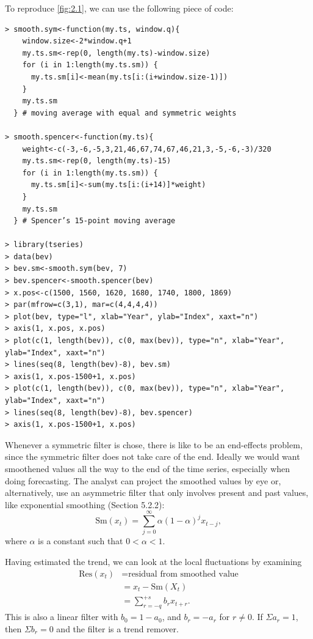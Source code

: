 To reproduce \cref{fig:2.1}, we can use the following piece of code:
\begin{verbatim}
> smooth.sym<-function(my.ts, window.q){
    window.size<-2*window.q+1
    my.ts.sm<-rep(0, length(my.ts)-window.size)
    for (i in 1:length(my.ts.sm)) {
      my.ts.sm[i]<-mean(my.ts[i:(i+window.size-1)])
    }
    my.ts.sm
  } # moving average with equal and symmetric weights

> smooth.spencer<-function(my.ts){
    weight<-c(-3,-6,-5,3,21,46,67,74,67,46,21,3,-5,-6,-3)/320
    my.ts.sm<-rep(0, length(my.ts)-15)
    for (i in 1:length(my.ts.sm)) {
	  my.ts.sm[i]<-sum(my.ts[i:(i+14)]*weight)
    }
    my.ts.sm
  } # Spencer’s 15-point moving average

> library(tseries)
> data(bev)
> bev.sm<-smooth.sym(bev, 7)
> bev.spencer<-smooth.spencer(bev)
> x.pos<-c(1500, 1560, 1620, 1680, 1740, 1800, 1869)
> par(mfrow=c(3,1), mar=c(4,4,4,4))
> plot(bev, type="l", xlab="Year", ylab="Index", xaxt="n")
> axis(1, x.pos, x.pos)
> plot(c(1, length(bev)), c(0, max(bev)), type="n", xlab="Year",
ylab="Index", xaxt="n")
> lines(seq(8, length(bev)-8), bev.sm)
> axis(1, x.pos-1500+1, x.pos)
> plot(c(1, length(bev)), c(0, max(bev)), type="n", xlab="Year",
ylab="Index", xaxt="n")
> lines(seq(8, length(bev)-8), bev.spencer)
> axis(1, x.pos-1500+1, x.pos)
\end{verbatim}

Whenever a symmetric filter is chose, there is like to be an end-effects problem, since the symmetric filter does not take care of the end. Ideally we would want smoothened values all the way to the end of the time series, especially when doing forecasting. The analyst can project the smoothed values by eye or, alternatively, use an asymmetric filter that only involves present and past values, like exponential smoothing (Section 5.2.2):
\[ \mathrm{Sm}(x_t) = \sum_{j = 0}^{\infty} \alpha(1 - \alpha)^j x_{t-j}, \]
where $\alpha$ is a constant such that $0 < \alpha < 1$.

Having estimated the trend, we can look at the local fluctuations by examining 
\begin{align*}
	\mathrm{Res}(x_t) 
	&= \text{residual from smoothed value} \\
	&= x_t - \mathrm{Sm}(X_t) \\
	&= \sum_{r = -q}^{+s} b_rx_{t+r}.
\end{align*}
This is also a linear filter with $b_0 = 1 - a_0$, and $b_r = -a_r$ for $r \neq 0$. If $\Sigma a_r = 1$, then $\Sigma b_r = 0$ and the filter is a trend remover.

